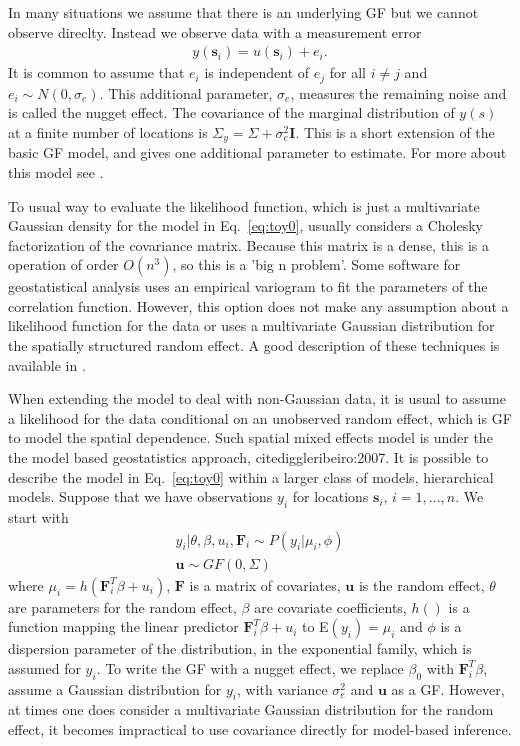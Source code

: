 In many situations we assume that there is an 
underlying GF but we cannot observe direclty. 
Instead we observe data with a measurement error 
\begin{align}\label{eq:toy0}
y(\textbf{s}_i) = u(\textbf{s}_i) + e_i .
\end{align}
It is common to assume that $e_i$ is 
independent of $e_j$ for all $i\neq j$ and 
$e_i \sim N(0, \sigma_e)$. 
This additional parameter, $\sigma_e$, measures 
the remaining noise and is called the nugget effect. 
The covariance of the marginal distribution 
of $y(s)$ at a finite number of locations 
is $\Sigma_y = \Sigma + \sigma^2_e\mathbf{I}$.
This is a short extension of the basic GF model,
and gives one additional parameter to estimate.    
For more about this model see 
\cite{diggleribeiro:2007}. 

To usual way to evaluate the likelihood function, 
which is just a multivariate Gaussian density for 
the model in Eq.~\ref{eq:toy0}, usually considers 
a Cholesky factorization of the covariance matrix. 
Because this matrix is a dense, 
this is a operation of order $O(n^3)$, 
so this is a 'big n problem'. 
Some software for geostatistical analysis 
uses an empirical variogram to fit the 
parameters of the correlation function. 
However, this option does not make any 
assumption about a likelihood function for the 
data or uses a multivariate Gaussian distribution 
for the spatially structured random effect. 
A good description of these techniques is 
available in \cite{cressie:1993}. 

When extending the model to deal with non-Gaussian 
data, it is usual to assume a likelihood for the 
data conditional on an unobserved random effect, 
which is GF to model the spatial dependence. 
Such spatial mixed effects model is under the 
the model based geostatistics approach, 
cite{diggleribeiro:2007}. 
It is possible to describe the model in Eq.~\ref{eq:toy0}
within a larger class of models, hierarchical models.
Suppose that we have observations $y_i$ for locations 
$\textbf{s}_i$, $i=1,...,n$. We start with 
\begin{equation}\begin{array}{c} 
y_i|\theta,\beta,u_i,\mathbf{F}_i \sim P(y_i|\mu_i,\phi) \\ 
\mathbf{u} \sim GF(0, \Sigma) 
\end{array}\end{equation}\label{eq:hm0} 
where $\mu_i = h(\mathbf{F}_i^{T}\beta + u_i)$, 
$\mathbf{F}$ is a matrix of covariates, 
$\mathbf{u}$ is the random effect, 
$\theta$ are parameters for the random effect, 
$\beta$ are covariate coefficients, 
$h()$ is a function mapping the linear predictor 
$\mathbf{F}_i^{T}\beta + u_i$ to E$(y_i) = \mu_i$ and 
$\phi$ is a dispersion parameter of the distribution, 
in the exponential family, which is assumed for $y_i$. 
To write the GF with a nugget effect, 
we replace $\beta_0$ with $\mathbf{F}_i^{T}\beta$, 
assume a Gaussian distribution for $y_i$, with 
variance $\sigma_e^2$ and $\mathbf{u}$ as a GF. 
However, at times one does consider a multivariate 
Gaussian distribution for the random effect, 
it becomes impractical to use covariance directly 
for model-based inference. 

